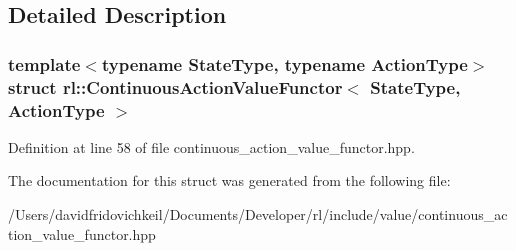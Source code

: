 \subsection{Detailed Description}
\subsubsection*{template$<$typename State\+Type, typename Action\+Type$>$\newline
struct rl\+::\+Continuous\+Action\+Value\+Functor$<$ State\+Type, Action\+Type $>$}



Definition at line 58 of file continuous\+\_\+action\+\_\+value\+\_\+functor.\+hpp.



The documentation for this struct was generated from the following file\+:\begin{DoxyCompactItemize}
\item 
/\+Users/davidfridovichkeil/\+Documents/\+Developer/rl/include/value/continuous\+\_\+action\+\_\+value\+\_\+functor.\+hpp\end{DoxyCompactItemize}
